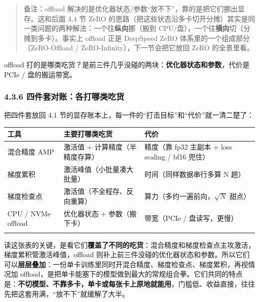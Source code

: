 \documentclass[
  chinese,
]{ctexart}
\begin{document}
\begin{quote}
备注：offload
解决的是优化器状态/参数``放不下''，靠的是把它们挪出显存。这和后面 4.4 节
ZeRO
的思路（把这些状态沿多卡切开分摊）其实是同一类问题的两种解法：一个往\textbf{纵向}挪（搬到
CPU/盘），一个往\textbf{横向}切（分摊到多卡）。事实上 offload 正是
DeepSpeed ZeRO 体系里的一个组成部分（ZeRO-Offload /
ZeRO-Infinity），下一节会把它放回 ZeRO 的全景里看。
\end{quote}

offload
打的是哪类吃货？是前三件几乎没碰的两块：\textbf{优化器状态和参数}，代价是
PCIe / 盘的搬运带宽。

\subsubsection{4.3.6
四件套对账：各打哪类吃货}\label{ux56dbux4ef6ux5957ux5bf9ux8d26ux5404ux6253ux54eaux7c7bux5403ux8d27}

把四件套放回 4.1
节的显存账本上，每一件的``打击目标''和``代价''就一清二楚了：

\begin{center}
\begin{tabular}{@{}>{\raggedright\arraybackslash}p{} >{\raggedright\arraybackslash}p{} >{\raggedright\arraybackslash}p{}@{}}
\toprule\noalign{}
工具 & 主要打哪类吃货 & 代价 \\
\midrule\noalign{}
混合精度 AMP & 激活值 + 计算精度（半精度存算） & 精度（靠 fp32 主副本 + loss scaling / bf16 兜住） \\
梯度累积 & 激活峰值（小批量凑大批量） & 时间（同样数据串行多算 N 趟） \\
梯度检查点 & 激活值（不全程存、反向重算） & 算力（多约一遍前向，\(\sqrt N\) 甜点） \\
CPU / NVMe offload & 优化器状态 + 参数（搬下卡） & 带宽（PCIe / 盘读写，更慢） \\
\bottomrule\noalign{}
\end{tabular}
\end{center}

读这张表的关键，是看它们\textbf{覆盖了不同的吃货}：混合精度和梯度检查点主攻激活，梯度累积管激活峰值，offload
则补上前三件没碰的优化器状态和参数。所以它们可以\textbf{层层叠加}：一份单卡训练里同时开混合精度、梯度检查点、梯度累积，再视情况加
offload，是把单卡能塞下的模型做到最大的常规组合拳。它们共同的特点是：\textbf{不切模型、不靠多卡，单卡或每张卡上原地就能用}，门槛低、收益直接，往往先把这套用满，``放不下''就缓解了大半。
\end{document}
